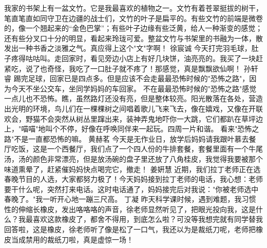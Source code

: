 {}\markdownRendererInterblockSeparator
{}我家的书架上有一盆文竹。它是我最喜欢的植物之一。文竹有着苍翠挺拔的树干，笔直笔直如同守卫在边疆的战士们，文竹的叶子是扁平的。有些文竹的前端是微卷的，像一个翘起来的“金色巴掌”；有些叶子边缘有些泛黄，给人一种渐变的感觉；还有些分叉口十分的明显，看起来玲珑可爱。整盆文竹与书架里的书融为一体，散发出一种书香之淡雅之气。真应得上这个"文"字啊！\markdownRendererInterblockSeparator
{}\markdownRendererInterblockSeparator
{}徐宸诚\markdownRendererInterblockSeparator
{}今天打完羽毛球，肚子疼得咕咕叫。走回家时，看见旁边小店上有好几块饼，油亮亮的。我买了一块赶紧吃，说了也奇怪，我吃了一口肚子就不疼了！那感觉，真是飘飘欲仙啊！\markdownRendererInterblockSeparator
{}\markdownRendererInterblockSeparator
{}孙轩睿\markdownRendererInterblockSeparator
{}踢完足球，回家已是四点多。但是应该不会走最最恐怖时候的"恐怖之路"，因为今天不坐公交车，坐同学妈妈的车回家。\markdownRendererInterblockSeparator
{}不在最最恐怖时候的"恐怖之路"感觉一点儿也不恐怖。瞧，虽然路灯还没有亮，但是整体较亮。阳光散落在各处，营造出光明的环境，鸟儿们在一棵棵树之间唱着歌儿飞来飞去，像在嬉戏，又像在开联欢会，野猫不会突然从树丛里蹿出来，装神弄鬼地吓你一大跳，它们都趴在草坪边上，"喵喵"地叫个不停，好像在呼唤同伴来一起玩。四周一片和谐。\markdownRendererInterblockSeparator
{}看来"恐怖之路"不是一直都恐怖的嘛。 \markdownRendererInterblockSeparator
{}\markdownRendererInterblockSeparator
{}黄赫茗\markdownRendererInterblockSeparator
{}今天是无作业日，放学后妈妈请我跟叶慕去餐厅吃饭，这是一个西餐厅，我们点了一个四人份的牛排套餐，套餐里面有一个牛尾汤，汤的颜色非常漂亮，但是放汤碗的盘子里还放了八角桂皮，我觉得我要被那个味道熏晕了，赶紧催妈妈快点喝完它，撤走！\markdownRendererInterblockSeparator
{}\markdownRendererInterblockSeparator
{}姜姸慧\markdownRendererInterblockSeparator
{}近期，我们拉丁老师正在选春晚节目的人选，大家都努力极了！今天妈妈接到拉丁老师的电话，我心想：老师要干什么呢，突然打来电话。这时电话通了，妈妈接完后对我说："你被老师选中春晚了。"我一听开心地一蹦三尺高。\markdownRendererInterblockSeparator
{}\markdownRendererInterblockSeparator
{}丁凝\markdownRendererInterblockSeparator
{}昨天科学课时候，遇到难题，我习惯性的伸缩长橡皮，发出咯咯咯的声音，徐老师显然听见了，把眼光投向我，这是什么？我最喜欢这款橡皮了，都舍不得用，到底怎么啦？可没等我想完就有同学替我回答啦，这是橡皮，徐老师听了像是松了一口气，我还以为是裁纸刀呢，老师把橡皮当成禁用的裁纸刀啦，真是虚惊一场！\markdownRendererInterblockSeparator
